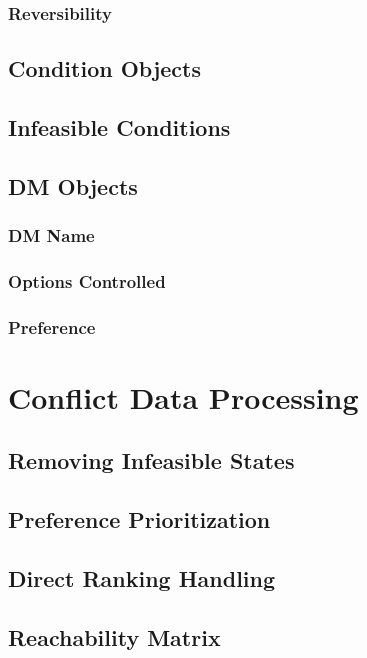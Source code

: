 \documentclass[letterpaper,12pt,titlepage,oneside,final]{book}
\begin{document}
\subsubsection{Reversibility}

\subsection{Condition Objects}


\subsection{Infeasible Conditions}

\subsection{DM Objects}

\subsubsection{DM Name}

\subsubsection{Options Controlled}

\subsubsection{Preference}


\section{Conflict Data Processing}

\subsection{Removing Infeasible States}

\subsection{Preference Prioritization}

\subsection{Direct Ranking Handling}


\subsection{Reachability Matrix}
\end{document}
